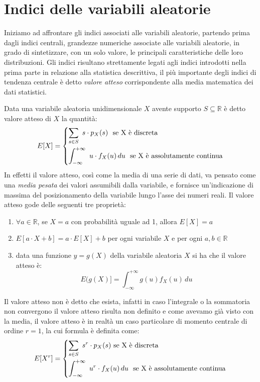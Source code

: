 \documentclass[a4paper,12pt, oneside]{book}
\newcommand{\numberset}{\mathbb}
\newcommand{\R}{\numberset{R}}
\begin{document}
\section{Indici delle variabili aleatorie}
Iniziamo ad affrontare gli indici associati alle variabili aleatorie, partendo prima dagli indici centrali,
grandezze numeriche associate alle variabili aleatorie, in grado di sintetizzare, con un solo valore,
le principali caratteristiche delle loro distribuzioni.\newline
Gli indici risultano strettamente legati agli indici introdotti nella prima parte in relazione alla 
statistica descrittiva, il più importante degli indici di tendenza centrale è detto \emph{valore atteso}
corrispondente alla media matematica dei dati statistici.

Data una variabile aleatoria unidimensionale $X$ avente supporto $S \subseteq \R$ è detto valore atteso di $X$ la quantità:
\[E[X] = \begin{dcases}
           \sum_{s\in S}\,\, s\cdot p_X(s) \,\,\mbox{ se X è discreta}\\
           \int_{-\infty}^{+\infty}\,\, u\cdot f_X(u)\,du \,\,\mbox{ se X è assolutamente continua}\\
         \end{dcases}\]
In effetti il valore atteso, così come la media di una serie di dati, va pensato come una \textit{media pesata}
dei valori assumibili dalla variabile, e fornisce un'indicazione di massima del posizionamento della variabile
lungo l'asse dei numeri reali.\newline
Il valore atteso gode delle seguenti tre proprietà:
\begin{enumerate}
    \item $\forall a \in \R$, se $X = a$ con probabilità uguale ad 1, allora $E[X] = a$
    \item $E[a\cdot X + b] = a\cdot E[X] + b$ per ogni variabile $X$ e per ogni $a, b \in \R$
    \item data una funzione $y = g(X)$ della variabile aleatoria $X$ si ha che il valore atteso è:
            \[E(g(X)]=\int_{-\infty}^{+\infty}g(u)f_X(u)\,du\]
\end{enumerate}
Il valore atteso non è detto che esista, infatti in caso l'integrale o la sommatoria non convergono il valore
atteso risulta non definito e come avevamo già visto con la media, il valore atteso è in realtà un caso
particolare di momento centrale di ordine $r = 1$, la cui formula è definita come:
\[ E[X^r] = \begin{dcases}
                \sum _{s \in S} \,\, s^r \cdot p_X(s) \,\,\mbox{se X è discreta}\\
                \int_{-\infty}^{+\infty}\,\, u^r\cdot f_X(u)\,du \,\,\mbox{ se X è assolutamente continua}\\
            \end{dcases}\]
\end{document}
